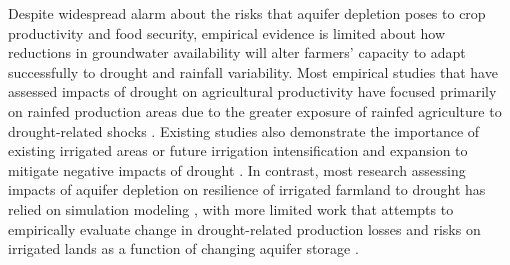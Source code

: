 \documentclass[
]{article}
\begin{document}
Despite widespread alarm about the risks that aquifer depletion poses to crop productivity and food security, empirical evidence is limited about how reductions in groundwater availability will alter farmers' capacity to adapt successfully to drought and rainfall variability. Most empirical studies that have assessed impacts of drought on agricultural productivity have focused primarily on rainfed production areas due to the greater exposure of rainfed agriculture to drought-related shocks \citep{schlenker2009nonlinear, lobell2014greater, schlenker2010robust, zhou2020connections, borgomeo2020impact}. Existing studies also demonstrate the importance of existing irrigated areas or future irrigation intensification and expansion to mitigate negative impacts of drought \citep{kuwayama2019estimating, zipper2016drought, zhu2022untangling, zhu2022warming, lu2020mapping, davis2019sensitivity, li2018changes}. In contrast, most research assessing impacts of aquifer depletion on resilience of irrigated farmland to drought has relied on simulation modeling \citep{foster2015well, cotterman2018groundwater, kahil2015modeling, yoon2021coupled, rad2020mod}, with more limited work that attempts to empirically evaluate change in drought-related production losses and risks on irrigated lands as a function of changing aquifer storage \citep{jain2021groundwater, suter2021depletion}.
\end{document}
